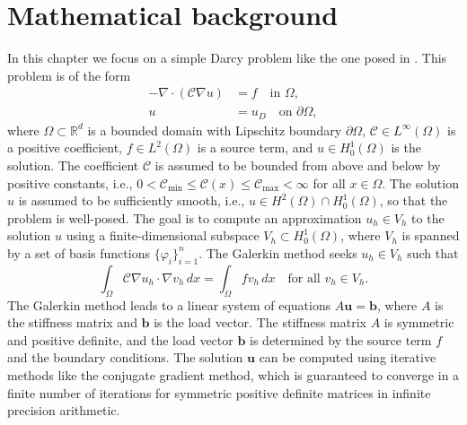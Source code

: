 \chapter{Mathematical background}\label{ch:background}\newpage
In this chapter we focus on a simple Darcy problem like the one posed in \cite{acms_coarse_space_Heinlein2018,ams_coarse_space_comp_study_Alves2024}. This problem is of the form
\begin{equation}
  \label{eq:elliptic_problem}
  \begin{aligned}
    -\nabla\cdot\left(\mathcal{C}\nabla u\right) & = f \quad \text{in } \Omega,           \\
    u                                       & = u_D \quad \text{on } \partial\Omega,
  \end{aligned}
\end{equation}
where $\Omega\subset\mathbb{R}^d$ is a bounded domain with Lipschitz boundary $\partial\Omega$, $\mathcal{C}\in L^\infty(\Omega)$ is a positive coefficient, $f\in L^2(\Omega)$ is a source term, and $u\in H^1_0(\Omega)$ is the solution. The coefficient $\mathcal{C}$ is assumed to be bounded from above and below by positive constants, i.e., $0 < \mathcal{C}_{\min} \leq \mathcal{C}(x) \leq \mathcal{C}_{\max} < \infty$ for all $x\in\Omega$. The solution $u$ is assumed to be sufficiently smooth, i.e., $u\in H^2(\Omega)\cap H^1_0(\Omega)$, so that the problem is well-posed. The goal is to compute an approximation $u_h\in V_h$ to the solution $u$ using a finite-dimensional subspace $V_h\subset H^1_0(\Omega)$, where $V_h$ is spanned by a set of basis functions $\{\varphi_i\}_{i=1}^n$. The Galerkin method seeks $u_h\in V_h$ such that
\begin{equation}
  \label{eq:galerkin}
  \int_\Omega \mathcal{C}\nabla u_h\cdot\nabla v_h\,dx = \int_\Omega f v_h\,dx \quad \text{for all } v_h\in V_h.
\end{equation}
The Galerkin method leads to a linear system of equations $A \mathbf{u} = \mathbf{b}$, where $A$ is the stiffness matrix and $\mathbf{b}$ is the load vector. The stiffness matrix $A$ is symmetric and positive definite, and the load vector $\mathbf{b}$ is determined by the source term $f$ and the boundary conditions. The solution $\mathbf{u}$ can be computed using iterative methods like the conjugate gradient method, which is guaranteed to converge in a finite number of iterations for symmetric positive definite matrices in infinite precision arithmetic.

